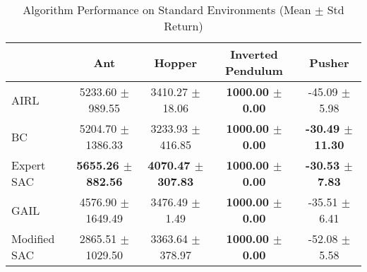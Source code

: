 \documentclass{article}
\begin{document}
\pagestyle{empty}

\begin{table}
\caption{Algorithm Performance on Standard Environments (Mean $\pm$ Std Return)}
\label{tab:perf_standard}
\begin{adjustbox}{max width=\textwidth, center}
\begin{tabular}{lcccc}
\toprule
 & Ant & Hopper & Inverted Pendulum & Pusher \\
\midrule
AIRL & 5233.60 $\pm$ 989.55 & 3410.27 $\pm$ 18.06 & \textbf{1000.00 $\pm$ 0.00} & -45.09 $\pm$ 5.98 \\
BC & 5204.70 $\pm$ 1386.33 & 3233.93 $\pm$ 416.85 & \textbf{1000.00 $\pm$ 0.00} & \textbf{-30.49 $\pm$ 11.30} \\
Expert SAC & \textbf{5655.26 $\pm$ 882.56} & \textbf{4070.47 $\pm$ 307.83} & \textbf{1000.00 $\pm$ 0.00} & \textbf{-30.53 $\pm$ 7.83} \\
GAIL & 4576.90 $\pm$ 1649.49 & 3476.49 $\pm$ 1.49 & \textbf{1000.00 $\pm$ 0.00} & -35.51 $\pm$ 6.41 \\
Modified SAC & 2865.51 $\pm$ 1029.50 & 3363.64 $\pm$ 378.97 & \textbf{1000.00 $\pm$ 0.00} & -52.08 $\pm$ 5.58 \\
\bottomrule
\end{tabular}
\end{adjustbox}
\end{table}
\end{document}
